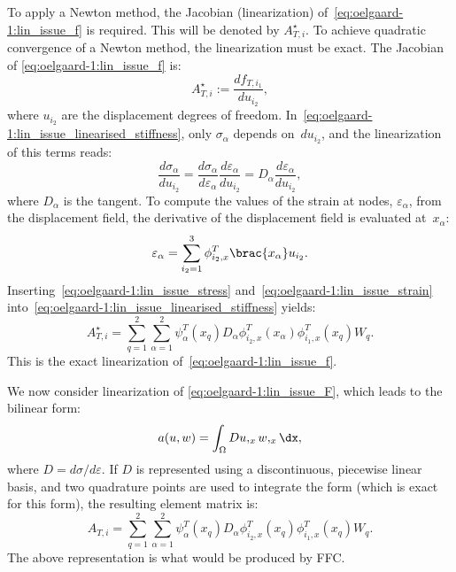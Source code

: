 To apply a Newton method, the Jacobian (linearization)
of~\eqref{eq:oelgaard-1:lin_issue_f} is required. This will be
denoted by $A^{\star}_{T,i}$.  To achieve quadratic convergence of
a Newton method, the linearization must be exact.  The Jacobian of
\eqref{eq:oelgaard-1:lin_issue_f} is:
%
\begin{equation}
\label{eq:oelgaard-1:lin_issue_linearised_stiffness}
A^{\star}_{T,i} := \frac{df_{T,i_{1}}}{du_{i_{2}}},
\end{equation}
%
where $u_{i_{2}}$ are the displacement degrees of freedom.
In~\eqref{eq:oelgaard-1:lin_issue_linearised_stiffness}, only
$\sigma_{\alpha}$ depends on~$du_{i_{2}}$, and the linearization of this
terms reads:
%
\begin{equation}
\label{eq:oelgaard-1:lin_issue_stress}
\frac{ d \sigma_{\alpha}}{du_{i_{2}}}
    = \frac{d \sigma_{\alpha}}{d \varepsilon_{\alpha}}
    \frac{d \varepsilon_{\alpha}}{du_{i_{2}}}
    = D_{\alpha} \frac{d \varepsilon_{\alpha}}{du_{i_{2}}},
\end{equation}
%
where $D_{\alpha}$ is the tangent. To compute the values of the strain
at nodes, $\varepsilon_{\alpha}$, from the displacement field, the
derivative of the displacement field is evaluated at~$x_{\alpha}$:
%
\begin{equation}
\label{eq:oelgaard-1:lin_issue_strain}
\varepsilon_{\alpha} = \sum_{i_{2}=1}^3 \phi^{T}_{i_{2},x}\brac{x_{\alpha}}u_{i_{2}}.
\end{equation}
%
Inserting~\eqref{eq:oelgaard-1:lin_issue_stress}
and~\eqref{eq:oelgaard-1:lin_issue_strain}
into~\eqref{eq:oelgaard-1:lin_issue_linearised_stiffness} yields:
%
\begin{equation}
\label{eq:oelgaard-1:lin_issue_k_star}
A^{\star}_{T,i} = \sum_{q=1}^{2}\sum_{\alpha=1}^2 \psi^{T}_{\alpha}(x_{q}) D_{\alpha}
\phi^{T}_{i_{2},x}(x_{\alpha}) \phi^{T}_{i_{1},x}(x_{q}) W_{q}.
\end{equation}
%
This is the exact linearization of~\eqref{eq:oelgaard-1:lin_issue_f}.

We now consider linearization of \eqref{eq:oelgaard-1:lin_issue_F},
which leads to the bilinear form:
%
\begin{equation}
a(u, w) = \int_{\Omega} D u,_{x} w,_{x} \dx,
\end{equation}
%
where $D = d\sigma / d\varepsilon$. If $D$ is represented using a
discontinuous, piecewise linear basis, and two quadrature points are
used to integrate the form (which is exact for this form), the resulting
element matrix is:
%
\begin{equation}
\label{eq:oelgaard-1:lin_issue_k}
A_{T,i} = \sum_{q=1}^{2}\sum_{\alpha=1}^2 \psi^{T}_{\alpha}(x_{q}) D_{\alpha}
\phi^{T}_{i_{2},x}(x_{q}) \phi^{T}_{i_{1},x}(x_{q}) W_{q}.
\end{equation}
%
The above representation is what would be produced by FFC.

